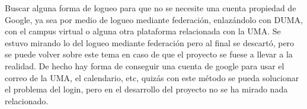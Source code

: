Buscar alguna forma de logueo para que no se necesite una cuenta propiedad de Google, ya sea por medio de logueo mediante federación, enlazándolo con DUMA, con el campus virtual o alguna otra plataforma relacionada con la UMA. Se estuvo mirando lo del logueo mediante federación pero al final se descartó, pero se puede volver sobre este tema en caso de que el proyecto se fuese a llevar a la realidad. De hecho hay forma de conseguir una cuenta de google para usar el correo de la UMA, el calendario, etc, quizás con este método se pueda solucionar el problema del login, pero en el desarrollo del proyecto no se ha mirado nada relacionado.






























